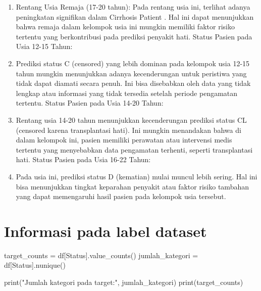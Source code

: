 \documentclass[
  letterpaper,
]{krantz}
\makeatletter
\newenvironment{Shaded}{\begin{snugshade}}{\end{snugshade}}
\newcommand{\BuiltInTok}[1]{\textcolor[rgb]{0.00,0.23,0.31}{#1}}
\newcommand{\NormalTok}[1]{\textcolor[rgb]{0.00,0.23,0.31}{#1}}
\newcommand{\OperatorTok}[1]{\textcolor[rgb]{0.37,0.37,0.37}{#1}}
\newcommand{\StringTok}[1]{\textcolor[rgb]{0.13,0.47,0.30}{#1}}
\newenvironment{kframe}{%
\medskip{}
\setlength{\fboxsep}{.8em}
 \def\at@end@of@kframe{}%
 \ifinner\ifhmode%
  \def\at@end@of@kframe{\end{minipage}}%
  \begin{minipage}{\columnwidth}%
 \fi\fi%
 \def\FrameCommand##1{\hskip\@totalleftmargin \hskip-\fboxsep
 \colorbox{shadecolor}{##1}\hskip-\fboxsep
     \hskip-\linewidth \hskip-\@totalleftmargin \hskip\columnwidth}%
 \MakeFramed {\advance\hsize-\width
   \@totalleftmargin\z@ \linewidth\hsize
   \@setminipage}}%
 {\par\unskip\endMakeFramed%
 \at@end@of@kframe}
\renewenvironment{Shaded}{\begin{kframe}}{\end{kframe}}
\makeatother
\begin{document}
\begin{enumerate}
\def\labelenumi{\arabic{enumi}.}
\item
  Rentang Usia Remaja (17-20 tahun): Pada rentang usia ini, terlihat
  adanya peningkatan signifikan dalam Cirrhosis Patient . Hal ini dapat
  menunjukkan bahwa remaja dalam kelompok usia ini mungkin memiliki
  faktor risiko tertentu yang berkontribusi pada prediksi penyakit hati.
  Status Pasien pada Usia 12-15 Tahun:
\item
  Prediksi status C (censored) yang lebih dominan pada kelompok usia
  12-15 tahun mungkin menunjukkan adanya kecenderungan untuk peristiwa
  yang tidak dapat diamati secara penuh. Ini bisa disebabkan oleh data
  yang tidak lengkap atau informasi yang tidak tersedia setelah periode
  pengamatan tertentu. Status Pasien pada Usia 14-20 Tahun:
\item
  Rentang usia 14-20 tahun menunjukkan kecenderungan prediksi status CL
  (censored karena transplantasi hati). Ini mungkin menandakan bahwa di
  dalam kelompok ini, pasien memiliki perawatan atau intervensi medis
  tertentu yang menyebabkan data pengamatan terhenti, seperti
  transplantasi hati. Status Pasien pada Usia 16-22 Tahun:
\item
  Pada usia ini, prediksi status D (kematian) mulai muncul lebih sering.
  Hal ini bisa menunjukkan tingkat keparahan penyakit atau faktor risiko
  tambahan yang dapat memengaruhi hasil pasien pada kelompok usia
  tersebut.
\end{enumerate}

\hypertarget{informasi-pada-label-dataset}{%
\section*{Informasi pada label
dataset}\label{informasi-pada-label-dataset}}


\begin{Shaded}
\begin{Highlighting}[]
\NormalTok{target\_counts }\OperatorTok{=}\NormalTok{ df[}\StringTok{\textquotesingle{}Status\textquotesingle{}}\NormalTok{].value\_counts()}
\NormalTok{jumlah\_kategori }\OperatorTok{=}\NormalTok{ df[}\StringTok{\textquotesingle{}Status\textquotesingle{}}\NormalTok{].nunique()}

\BuiltInTok{print}\NormalTok{(}\StringTok{"Jumlah kategori pada target:"}\NormalTok{, jumlah\_kategori)}
\BuiltInTok{print}\NormalTok{(target\_counts)}
\end{Highlighting}
\end{Shaded}
\end{document}
